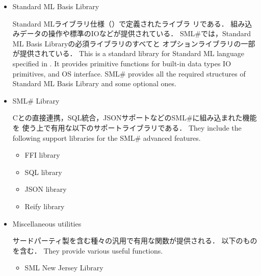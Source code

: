 \documentclass{jbook}
\newcommand{\txt}[2]{#2}
\newcommand{\smlsharp}{SML\#}
\begin{document}
\begin{itemize}
\item \txt{Standard ML標準ライブラリ}{Standard ML Basis Library}

\ifjp%
	Standard MLライブラリ仕様（\cite{smlbasis}）で定義されたライブラ
リである．
	組み込みデータの操作や標準のIOなどが提供されている．
	\smlsharp{}では，Standard ML Basis Libraryの必須ライブラリのすべてと
オプションライブラリの一部が提供されている．
\else%
	This is a standard library for Standard ML language specified in 
\cite{smlbasis}.
	It provides primitive functions for built-in data types
IO primitives, and  OS interface.
	\smlsharp{} provides all the required structures of Standard ML
Basis Library and some optional ones.
\fi%

\item \txt{\smlsharp{}ライブラリ}{\smlsharp{} Library}

\ifjp%
	Cとの直接連携，SQL統合，JSONサポートなどの\smlsharp{}に組み込まれた機能を
使う上で有用な以下のサポートライブラリである．
\else%
	They include the following support libraries for the \smlsharp{} advanced features.
\fi%
\begin{itemize}
\item \txt{FFIライブラリ}{FFI library}
\item \txt{SQLライブラリ}{SQL library}
\item \txt{JSONライブラリ}{JSON library}
\item \txt{Reifyライブラリ}{Reify library}
\end{itemize}

\item \txt{ユーテリティ群}{Miscellaneous utilities}

\ifjp%
	サードパーティ製を含む種々の汎用で有用な関数が提供される．
	以下のものを含む．
\else%
	They provide various useful functions.
\fi%

\begin{itemize}
\item \txt{SML New Jerseyライブラリ}{SML New Jersey Library}
\end{itemize}


\end{itemize}
\end{document}
